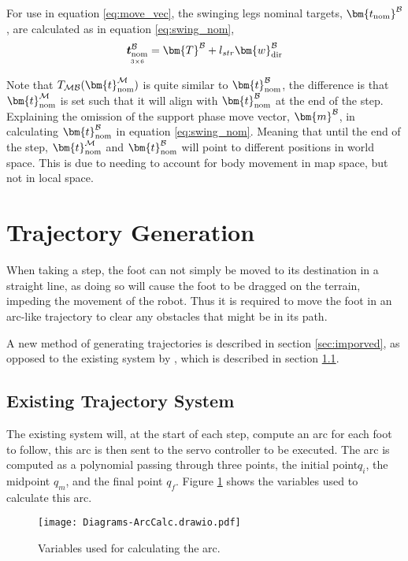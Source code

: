                 For use in equation \ref{eq:move_vec}, the swinging legs nominal targets, \(\bm{t_\text{nom}} ^\fbody\), are calculated as 
                in equation \ref{eq:swing_nom},
                \begin{equation} \label{eq:swing_nom}
                    \mdim{\boldsymbol{t}_\text{nom}^\fbody}{3}{6} = \bm{T}^\fbody + l_{str}\bm{w}_\text{dir}^\fbody
                \end{equation}

                \noindent
                Note that \(\transframe{\bm{t}_\text{nom}^{\fmap}}{\fmap}{\fbody}\) is quite similar to \(\bm{t}_\text{nom}^\fbody\), the difference is that \(\bm{t}_\text{nom}^{\fmap}\) is set such that it will align with \(\bm{t}_\text{nom}^\fbody\) at the end of the step. Explaining the omission of the support phase move vector, \(\bm{m}^\fbody\), in calculating \(\bm{t}_\text{nom}^\fbody\) in equation \ref{eq:swing_nom}. Meaning that until the end of the step, \(\bm{t}_\text{nom}\inrefframe{M}\) and \(\bm{t}_\text{nom}^\fbody\) will point to different positions in world space. This is due to needing to account for body movement in map space, but not in local space.

        \newpage
    \section{Trajectory Generation} \label{sec:arc_generation}
        When taking a step, the foot can not simply be moved to its destination in a straight line, as doing so will cause the foot to be dragged on the terrain, impeding the movement of the robot. Thus it is required to move the foot in an arc-like trajectory to clear any obstacles that might be in its path.

        A new method of generating trajectories is described in section \ref{sec:imporved}, as opposed to the existing system by \cite{erasmus2023guidance}, which is described in section \ref{sec:existing}.

        \subsection{Existing Trajectory System} \label{sec:existing}
            The existing system will, at the start of each step, compute an arc for each foot to follow, this arc is then sent to the servo controller
            to be executed. The arc is computed as a polynomial passing through three points, the initial point\(q_i\), the midpoint \(q_m\), and the final point \(q_f\).
            Figure \ref{fig:old_arc_vars} shows the variables used to calculate this arc.
            \begin{figure}[h]
                \centering
                \texttt{[image: Diagrams-ArcCalc.drawio.pdf]}
                \caption{Variables used for calculating the arc.}
                \label{fig:old_arc_vars}
            \end{figure}

